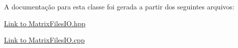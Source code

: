 A documentação para esta classe foi gerada a partir dos seguintes arquivos\-:\begin{DoxyCompactItemize}
\item 
\hyperlink{Link_01to_01MatrixFilesIO_8hpp}{Link to Matrix\-Files\-I\-O.\-hpp}\item 
\hyperlink{Link_01to_01MatrixFilesIO_8cpp}{Link to Matrix\-Files\-I\-O.\-cpp}\end{DoxyCompactItemize}
